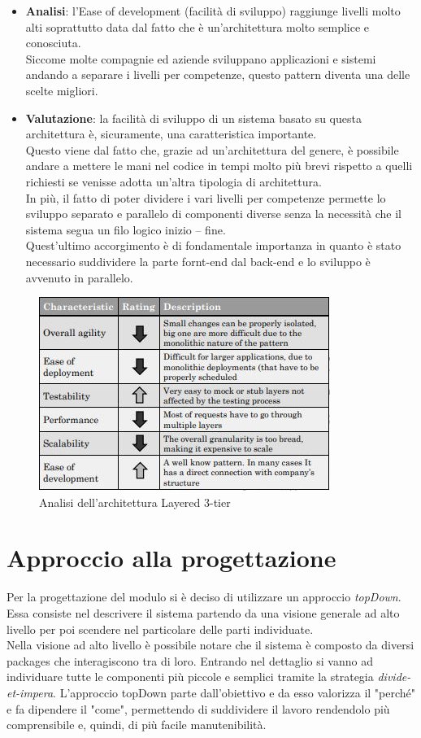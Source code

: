 \begin{itemize}
\begin{itemize}
		\item \textbf{Analisi}: l'Ease of development (facilità di sviluppo) raggiunge livelli molto alti soprattutto data dal fatto che è un'architettura molto semplice e conosciuta.\\
		Siccome molte compagnie ed aziende sviluppano applicazioni e sistemi andando a separare i livelli per competenze, questo pattern diventa una delle scelte migliori\cite{3tierArch, 3tierArch2}.
		\item \textbf{Valutazione}: la facilità di sviluppo di un sistema basato su questa architettura è, sicuramente, una caratteristica importante.\\
		Questo viene dal fatto che, grazie ad un'architettura del genere, è possibile andare a mettere le mani nel codice in tempi molto più brevi rispetto a quelli richiesti se venisse adotta un'altra tipologia di architettura.\\
		In più, il fatto di poter dividere i vari livelli per competenze permette lo sviluppo separato e parallelo di componenti diverse senza la necessità che il sistema segua un filo logico inizio – fine.\\
		Quest'ultimo accorgimento è di fondamentale importanza in quanto è stato necessario suddividere la parte fornt-end dal back-end e lo sviluppo è avvenuto in parallelo.
	\end{itemize}
\end{itemize}
\begin{figure}[h]
	\centering
	\includegraphics[scale=1]{immagini/layered_architecture_analysis}
	\caption{Analisi dell'architettura Layered 3-tier \cite{slidesCardin}}
	\label{img:analisiArchitettura}
\end{figure}
\section{Approccio alla progettazione}
Per la progettazione del modulo si è deciso di utilizzare un approccio \emph{\gls{topDown}}\glsfirstoccur. Essa consiste nel descrivere il sistema partendo da una visione generale ad alto livello per poi scendere nel particolare delle parti individuate.\\
Nella visione ad alto livello è possibile notare che il sistema è composto da diversi packages che interagiscono tra di loro. Entrando nel dettaglio si vanno ad individuare tutte le componenti più piccole e semplici tramite la strategia \textit{divide-et-impera}. L'approccio \gls{topDown} parte dall'obiettivo e da esso valorizza il "perché" e fa dipendere il "come", permettendo di suddividere il lavoro rendendolo più comprensibile e, quindi, di più facile manutenibilità.
